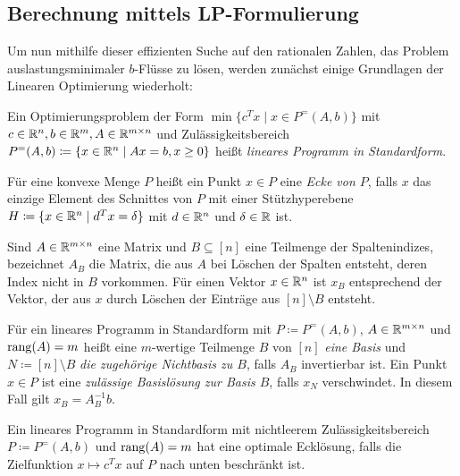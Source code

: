

\subsection{Berechnung mittels LP-Formulierung}

Um nun mithilfe dieser effizienten Suche auf den rationalen Zahlen, das Problem auslastungsminimaler $b$-Flüsse zu lösen, werden zunächst einige Grundlagen der Linearen Optimierung wiederholt:
\begin{definition}
	Ein Optimierungsproblem der Form $\min\{ c^T x \mid x \in P^=(A, b) \}$ mit $c\in\mathbb{R}^n, b\in\mathbb{R}^m, A\in\mathbb{R}^{m\times n}$ und Zulässigkeitsbereich $P^=(A,b)\coloneq \{ x\in\mathbb{R}^n \mid Ax = b, x\geq 0 \}$ heißt \emph{lineares Programm in Standardform}.
\end{definition}

\begin{definition}
	Für eine konvexe Menge $P$ heißt ein Punkt $x\in P$ eine \emph{Ecke von $P$}, falls $x$ das einzige Element des Schnittes von $P$ mit einer Stützhyperebene $H\coloneq \{ x\in\mathbb{R}^n \mid d^T x = \delta \}$ mit $d\in\mathbb{R}^n$ und $\delta\in\mathbb{R}$ ist.
\end{definition}

\begin{notation}
Sind $A\in\mathbb{R}^{m\times n}$ eine Matrix und $B\subseteq[n]$ eine Teilmenge der Spaltenindizes, bezeichnet $A_B$ die Matrix, die aus $A$ bei Löschen der Spalten entsteht, deren Index nicht in $B$ vorkommen.
Für einen Vektor $x\in\mathbb{R}^n$ ist $x_B$ entsprechend der Vektor, der aus $x$ durch Löschen der Einträge aus $[n]\setminus B$ entsteht.
\end{notation}

\begin{definition}
Für ein lineares Programm in Standardform mit $P\coloneq P^=(A, b)$, $A\in\mathbb{R}^{m\times n}$ und $\operatorname{rang}(A) = m$ heißt eine $m$-wertige Teilmenge $B$ von $[n]$ \emph{eine Basis} und $N\coloneq [n]\setminus B$ \emph{die zugehörige Nichtbasis zu $B$}, falls $A_B$ invertierbar ist.
Ein Punkt $x\in P$ ist eine \emph{zulässige Basislösung zur Basis $B$}, falls $x_N$ verschwindet.
In diesem Fall gilt $x_B = A_B^{-1} b$.
\end{definition}

\begin{satz}\label{satz-existence-optimality-for-lps}
	Ein lineares Programm in Standardform mit nichtleerem Zulässigkeitsbereich $P\coloneq P^=(A,b)$ und $\operatorname{rang}(A) = m$ hat eine optimale Ecklösung, falls die Zielfunktion $x\mapsto c^T x$ auf $P$ nach unten beschränkt ist.
\end{satz}

